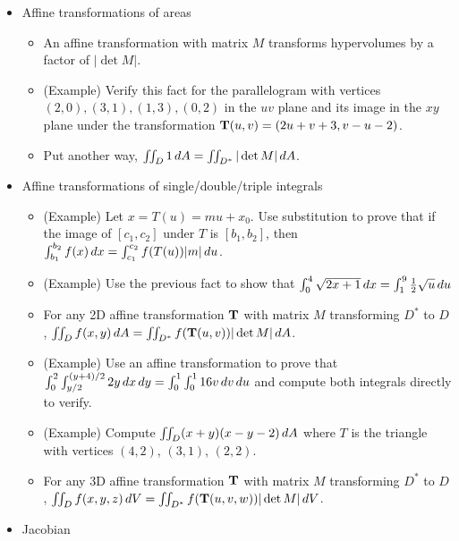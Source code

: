 \documentclass[11pt]{article}
\begin{document}
\begin{itemize}
  \item Affine transformations of areas
    \begin{itemize}
      \item An affine transformation with matrix \(M\) transforms hypervolumes
            by a factor of \(|\det M|\).
      \item (Example) Verify this fact for the parallelogram
            with vertices \((2,0),(3,1),(1,3),(0,2)\) in the \(uv\) plane
            and its image in the \(xy\) plane under
            the transformation \(\mathbf{T}(u,v)=(2u+v+3,v-u-2)\).
      \item Put another way, \(\iint_{D}1\,d A=\iint_{D^*}|\det M|\,d A\).
    \end{itemize}
  \item Affine transformations of single/double/triple integrals
    \begin{itemize}
      \item (Example) Let \(x=T(u)=mu+x_0\).
            Use substitution to prove that
            if the image of \([c_1,c_2]\) under \(T\) is \([b_1,b_2]\), then
            \(\int_{b_1}^{b_2}f(x)\,d x=\int_{c_1}^{c_2}f(T(u))|m|\,d u\).
      \item (Example) Use the previous fact to show that
            \(\int_0^4 \sqrt{2x+1}\,d x=\int_1^9 \frac{1}{2}\sqrt{u}\,d u\)
      \item For any 2D affine transformation \(\mathbf{T}\) with matrix \(M\)
            transforming \(D^*\) to \(D\),
            \(\iint_D f(x,y)\,d A=\iint_{D^*}f(\mathbf{T}(u,v))|\det M|\,d A\).
      \item (Example) Use an affine transformation to prove that
            \(
              \int_0^2\int_{y/2}^{(y+4)/2}2y\,d x\,d y
                =
              \int_0^1\int_0^1 16v\,d v\,d u
            \)
            and compute both integrals directly to verify.
      \item (Example)
            Compute \(\iint_D (x+y)(x-y-2)\,d{A}\) where \(T\) is the
            triangle with vertices \((4,2)\), \((3,1)\), \((2,2)\).
      \item For any 3D affine transformation \(\mathbf{T}\) with matrix \(M\)
            transforming \(D^*\) to \(D\),
            \(\iint_D f(x,y,z)\,d V=\iint_{D^*}f(\mathbf{T}(u,v,w))|\det M|\,d V\).
    \end{itemize}
  \item Jacobian
    \begin{itemize}

\end{itemize}
\end{itemize}
\end{document}
